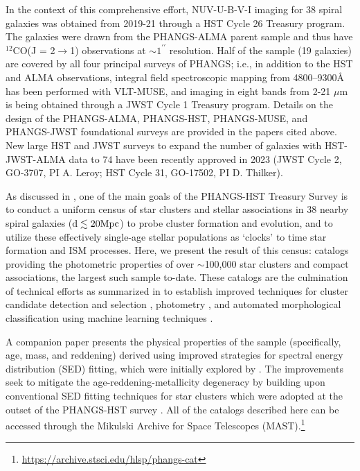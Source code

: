 \documentclass[linenumbers]{aastex63}
\begin{document}
In the context of this comprehensive effort, NUV-U-B-V-I imaging for 38 spiral galaxies was obtained from 2019-21 through a HST Cycle 26 Treasury program.  The galaxies were drawn from the PHANGS-ALMA parent sample and thus have $^{12}$CO(J = 2$\rightarrow$1) observations at $\sim1^{\prime\prime}$ resolution.  Half of the sample (19 galaxies) are covered by all four principal surveys of PHANGS; i.e., in addition to the HST and ALMA observations, integral field spectroscopic mapping from 4800–9300\AA\, has been performed with VLT-MUSE, and imaging in eight bands from 2-21 $\mu$m is being obtained through a JWST Cycle 1 Treasury program.  Details on the design of the PHANGS-ALMA, PHANGS-HST, PHANGS-MUSE, and PHANGS-JWST foundational surveys are provided in the papers cited above.  New large HST and JWST surveys to expand the number of galaxies with HST-JWST-ALMA data to 74 have been recently approved in 2023 (JWST Cycle 2, GO-3707, PI A. Leroy; HST Cycle 31, GO-17502, PI D. Thilker).

As discussed in \cite{lee_phangs-hst_2022}, one of the main goals of the PHANGS-HST Treasury Survey is to conduct a uniform census of star clusters and stellar associations in 38 nearby spiral galaxies (${\rm d \lesssim 20 Mpc}$) to probe cluster formation and evolution, and to utilize these effectively single-age stellar populations as `clocks' to time star formation and ISM processes.  Here, we present the result of this census: catalogs providing the photometric properties of over $\sim$100,000 star clusters and compact associations, the largest such sample to-date.  These catalogs are the culmination of technical efforts as summarized in \cite{lee_phangs-hst_2022} to establish improved techniques for cluster candidate detection and selection \citep{whitmore_star_2021, thilker_phangs-hst_2022}, photometry \citep{deger_bright_2022}, and automated morphological classification using machine learning techniques \citep{wei_deep_2020, whitmore_star_2021, hannon_star_2023}.  

A companion paper \citep[][hereafter Paper II]{thilker23sed} presents the physical properties of the sample (specifically, age, mass, and reddening) derived using improved strategies for spectral energy distribution (SED) fitting, which were initially explored by \citet{whitmore_improving_2023}.  The improvements seek to mitigate the age-reddening-metallicity degeneracy by building upon conventional SED fitting techniques for star clusters which were adopted at the outset of the PHANGS-HST survey \citep{turner_phangs-hst_2021}.  All of the catalogs described here can be accessed through the Mikulski Archive for Space Telescopes (MAST).\footnote{\url{https://archive.stsci.edu/hlsp/phangs-cat}}
\end{document}
